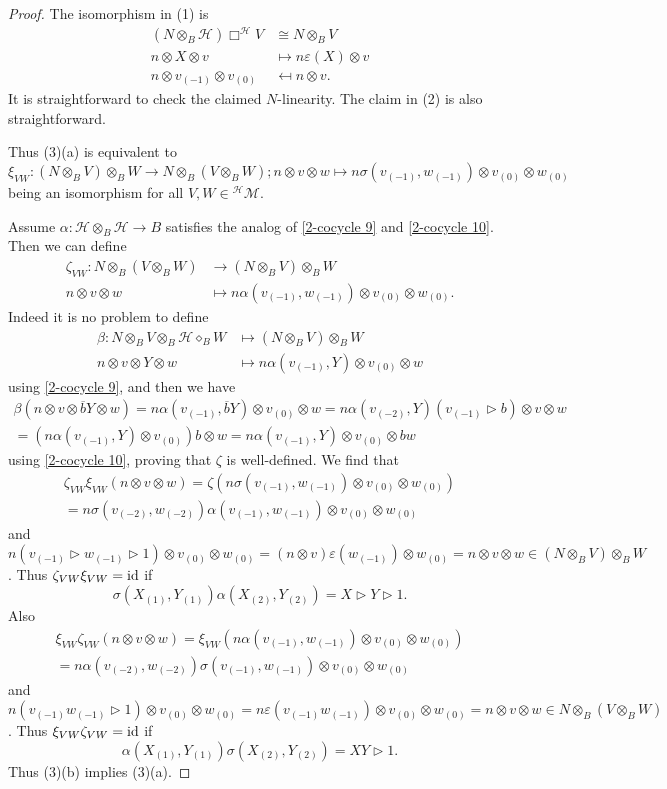 \documentclass[a4paper,reqno]{amsart}
\newcommand*{\id}{\textup{id}}
\numberwithin{equation}{section}
\theoremstyle{plain}
\theoremstyle{remark}
\numberwithin{equation}{section}
\newcommand{\ot}{\otimes}
\newcommand\ol{\overline}
\newcommand{\z}{{}_{\scriptscriptstyle{(0)}}}
\renewcommand{\o}{{}_{\scriptscriptstyle{(1)}}}
\newcommand{\mo}{{}_{\scriptscriptstyle{(-1)}}}
\renewcommand{\t}{{}_{\scriptscriptstyle{(2)}}}
\newcommand{\mt}{{}_{\scriptscriptstyle{(-2)}}}
\newcommand{\di}{{\diamond_{B}}}
\newcommand\ou[1]{\otimes_{#1}}
\newcommand{\la}{{\triangleright}}
\newcommand{\CH}{\mathcal{H}}
\newcommand\LComod[1]{{^{#1}}\mathcal M}
\begin{document}
\begin{proof}
    The isomorphism in (1) is
    \begin{align*}
        (N\ou B\CH)\Box^\CH V&\cong N\ou BV\\
        n\ot X\ot v&\mapsto n\varepsilon(X)\ot v\\
        n\ot v\mo\ot v\z&\mapsfrom n\ot v.
    \end{align*}
    It is straightforward to check the claimed $N$-linearity. The claim in (2) is also straightforward. 

    Thus (3)(a) is equivalent to
        \[\xi_{VW}\colon (N\ou BV)\ou BW\to N\ot_{B} (V\ou BW); n\ot v\ot w\mapsto n\sigma(v\mo,w\mo)\ot v\z\ot w\z\]
        being an isomorphism for all $V,W\in\LComod\CH.$

    Assume $\alpha\colon \CH\ou B\CH\to B$ satisfies the analog of \eqref{2-cocycle 9} and \eqref{2-cocycle 10}. Then we can define 
    \begin{align*}
      \zeta_{VW}\colon N\ou B(V\ou BW)&\to (N\ou BV)\ou B W\\
      n\ot v\ot w&\mapsto n\alpha(v\mo,w\mo)\ot v\z\ot w\z.
    \end{align*}
    Indeed it is no problem to define 
    \begin{align*}
        \beta\colon N\ou BV\ou B\CH\di W&\mapsto (N\ou BV)\ou BW\\
        n\ot v\ot Y\ot w&\mapsto n\alpha(v\mo,Y)\ot v\z\ot w
    \end{align*}
    using \eqref{2-cocycle 9}, and then we have
    \begin{multline*}
        \beta(n\ot v\ot \ol bY\ot w)=n\alpha(v\mo,\ol bY)\ot v\z\ot w
        =n\alpha(v\mt,Y)(v\mo\la b)\ot v\ot w
        \\=(n\alpha(v\mo,Y)\ot v\z)b\ot w
        =n\alpha(v\mo,Y)\ot v\z\ot bw
    \end{multline*}
    using \eqref{2-cocycle 10}, proving that $\zeta$ is well-defined. We find that
    \begin{multline*}
        \zeta_{VW}\xi_{VW}(n\ot v\ot w)=\zeta(n\sigma(v\mo,w\mo)\ot v\z\ot w\z)
        \\=n\sigma(v\mt,w\mt)\alpha(v\mo,w\mo)\ot v\z\ot w\z
    \end{multline*}
    and $n(v\mo\la w\mo\la 1)\ot v\z\ot w\z=(n\ot v)\varepsilon(w\mo)\ot w\z=n\ot v\ot w\in (N\ot_{B}V)\ot_{B}W$. Thus $\zeta_{VW}\xi_{VW}=\id$ if
    \begin{equation*}
          \sigma(X\o,Y\o)\alpha(X\t,Y\t)=X\la Y\la 1.
    \end{equation*}
    Also
    \begin{multline*}
        \xi_{VW}\zeta_{VW}(n\ot v\ot w)=\xi_{VW}(n\alpha(v\mo,w\mo)\ot v\z\ot w\z)
        \\=n\alpha(v\mt,w\mt)\sigma(v\mo,w\mo)\ot v\z\ot w\z
    \end{multline*}
    and $n(v\mo w\mo\la 1)\ot v\z\ot w\z=n\varepsilon(v\mo w\mo)\ot v\z\ot w\z=n\ot v\ot w\in N\ot_{B}(V\ot_{B}W)$. Thus $\xi_{VW}\zeta_{VW}=\id$ if 
    \begin{equation*}      \alpha(X\o,Y\o)\sigma(X\t,Y\t)=XY\la 1.
    \end{equation*}
    Thus (3)(b) implies (3)(a).


\end{proof}
\end{document}
